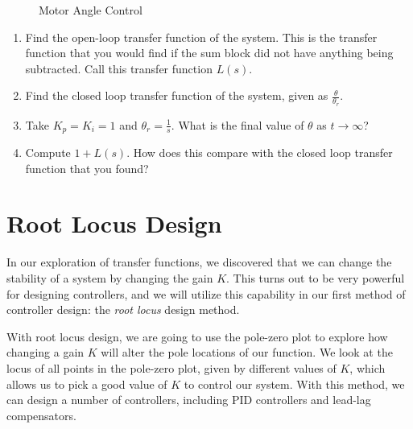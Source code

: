 \begin{exercise}[DC Motor]
\begin{enumerate}
\begin{figure}[H]
\begin{tikzpicture}[x=0.75pt,y=0.75pt,yscale=-0.9,xscale=0.9]
\end{tikzpicture}

        \caption{Motor Angle Control}
        \label{fig:motor angle control}
    \end{figure}
    \begin{enumerate}
        \item Find the open-loop transfer function of the system. This is the transfer function that you would find if the sum block did not have anything being subtracted. Call this transfer function $L(s)$.
        \item Find the closed loop transfer function of the system, given as $\frac{\theta}{\theta_r}$.
        \item Take $K_p=K_i=1$ and $\theta_r=\frac{1}{s}$. What is the final value of $\theta$ as $t\rightarrow\infty$?
        \item Compute $1+L(s)$. How does this compare with the closed loop transfer function that you found?
    \end{enumerate}
\end{enumerate}

\end{exercise}

\newpage
\printendnotes

\chapter{Root Locus Design}\label{chap:root locus}

In our exploration of transfer functions, we discovered that we can change the stability of a system by changing the gain $K$.  This turns out to be very powerful for designing controllers, and we will utilize this capability in our first method of controller design: the \textit{root locus} design method.

With root locus design, we are going to use the pole-zero plot to explore how changing a gain $K$ will alter the pole locations of our function. We look at the locus of all points in the pole-zero plot, given by different values of $K$, which allows us to pick a good value of $K$ to control our system. With this method, we can design a number of controllers, including PID controllers and lead-lag compensators.


